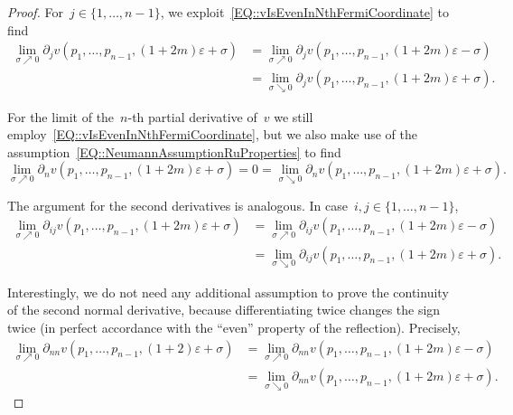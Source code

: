 \documentclass[12pt,a4paper]{amsart}
\numberwithin{equation}{section}
\theoremstyle{definition}
\theoremstyle{remark}
\newcommand{\eps}{\varepsilon}
\begin{document}
\begin{proof}
    For~$j \in \{1,\dots,n-1\}$, we exploit~\eqref{EQ::vIsEvenInNthFermiCoordinate} to find
    \begin{equation}\label{EQ::vTangentialDerivativeLimits}
        \begin{split}
            \lim_{\sigma \nearrow 0} \partial_j v(p_1, \dots, p_{n-1}, (1+2m)\eps + \sigma) &= \lim_{\sigma \nearrow 0} \partial_j v(p_1, \dots, p_{n-1}, (1+2m)\eps - \sigma)\\
                &= \lim_{\sigma \searrow 0} \partial_j v(p_1, \dots, p_{n-1}, (1+2m)\eps + \sigma).
        \end{split}
    \end{equation}

    For the limit of the~$n$-th partial derivative of~$v$ we still employ~\eqref{EQ::vIsEvenInNthFermiCoordinate}, but we also make use of the assumption~\eqref{EQ::NeumannAssumptionRuProperties} to find
    \begin{equation}\label{EQ::vNormalDerivativeLimits}
        \lim_{\sigma \nearrow 0} \partial_n v(p_1, \dots, p_{n-1}, (1+2m)\eps + \sigma) = 0 = \lim_{\sigma \searrow 0} \partial_n v(p_1, \dots, p_{n-1}, (1+2m)\eps + \sigma).
    \end{equation}

    The argument for the second derivatives is analogous. In case~$i,j \in \{1,\dots,n-1\}$,
    \begin{equation}\label{EQ::vSecondTangentialDerivativeLimits}
        \begin{split}
            \lim_{\sigma \nearrow 0} \partial_{ij} v(p_1, \dots, p_{n-1}, (1+2m)\eps + \sigma) &= \lim_{\sigma \nearrow 0} \partial_{ij} v(p_1, \dots, p_{n-1}, (1+2m)\eps - \sigma)\\
                &= \lim_{\sigma \searrow 0} \partial_{ij} v(p_1, \dots, p_{n-1}, (1+2m)\eps + \sigma).
        \end{split}
    \end{equation}

    Interestingly, we do not need any additional assumption to prove the continuity of the second normal derivative, because differentiating twice changes the sign twice (in perfect accordance with the ``even'' property of the reflection). Precisely,
    \begin{equation}\label{EQ::vSecondNormalDerivativeLimits}
        \begin{split}
            \lim_{\sigma \nearrow 0} \partial_{nn} v(p_1, \dots, p_{n-1}, (1+2)\eps + \sigma) &= \lim_{\sigma \nearrow 0} \partial_{nn} v(p_1, \dots, p_{n-1}, (1+2m)\eps - \sigma)\\
                &= \lim_{\sigma \searrow 0} \partial_{nn} v(p_1, \dots, p_{n-1}, (1+2m)\eps + \sigma).
        \end{split}
    \end{equation}


\end{proof}
\end{document}
